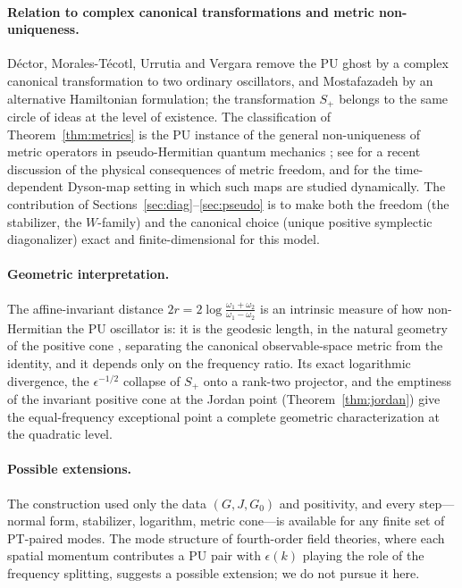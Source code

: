 \documentclass[11pt]{article}
\theoremstyle{definition}
\theoremstyle{remark}
\newcommand{\w}{\omega}
\begin{document}
\paragraph{Relation to complex canonical transformations and metric
non-uniqueness.}
D\'ector, Morales-T\'ecotl, Urrutia and Vergara \cite{Dector2009} remove the
PU ghost by a complex canonical transformation to two ordinary oscillators,
and Mostafazadeh \cite{Mostafazadeh2010PU} by an alternative Hamiltonian
formulation; the transformation $S_+$ belongs to the same circle of ideas at
the level of existence.  The classification of
Theorem~\ref{thm:metrics} is the PU instance of the general non-uniqueness
of metric operators in pseudo-Hermitian quantum mechanics
\cite{SGH1992,Mostafazadeh2010}; see \cite{Znojil2025} for a recent
discussion of the physical consequences of metric freedom, and
\cite{FringFrith2017,Fring2023} for the time-dependent Dyson-map
\cite{Dyson1956} setting in which such maps are studied dynamically.  The
contribution of Sections~\ref{sec:diag}--\ref{sec:pseudo} is to make both the
freedom (the stabilizer, the $W$-family) and the canonical choice (unique
positive symplectic diagonalizer) exact and finite-dimensional for this
model.

\paragraph{Geometric interpretation.}
The affine-invariant distance $2r=2\log\frac{\w_1+\w_2}{\w_1-\w_2}$ is an
intrinsic measure of how non-Hermitian the PU oscillator is: it is the
geodesic length, in the natural geometry of the positive cone
\cite{Bhatia2007}, separating the canonical observable-space metric from the
identity, and it depends only on the frequency ratio.  Its exact logarithmic
divergence, the $\epsilon^{-1/2}$ collapse of $S_+$ onto a rank-two
projector, and the emptiness of the invariant positive cone at the Jordan
point (Theorem~\ref{thm:jordan}) give the equal-frequency exceptional point a
complete geometric characterization at the quadratic level.

\paragraph{Possible extensions.}
The construction used only the data $(G,J,G_0)$ and positivity, and every
step---normal form, stabilizer, logarithm, metric cone---is available for any
finite set of PT-paired modes.  The mode structure of fourth-order field
theories, where each spatial momentum contributes a PU pair with
$\epsilon(k)$ playing the role of the frequency splitting, suggests a
possible extension; we do not pursue it here.
\end{document}
